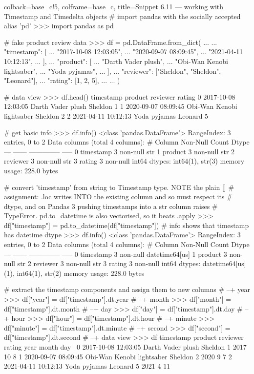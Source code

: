 \documentclass[a4paper,11pt]{book}
\begin{document}
\begin{pythoncode}[linenos=True]{colback=base_c!5, colframe=base_c, title=\sffamily Snippet 6.11 --- working with Timestamp and Timedelta objects}
# import pandas with the socially accepted alias 'pd'
>>> import pandas as pd

# fake product review data
>>> df = pd.DataFrame.from_dict(
...     {
...         "timestamp": [
...             "2017-10-08 12:03:05",
...             "2020-09-07 08:09:45",
...             "2021-04-11 10:12:13",
...         ],
...         "product": [
...             "Darth Vader plush",
...             "Obi-Wan Kenobi lightsaber",
...             "Yoda pyjamas",
...         ],
...         "reviewer": ["Sheldon", "Sheldon", "Leonard"],
...         "rating": [1, 2, 5],
...     }
... )

# data view
>>> df.head()
             timestamp                    product reviewer  rating
0  2017-10-08 12:03:05          Darth Vader plush  Sheldon       1
1  2020-09-07 08:09:45  Obi-Wan Kenobi lightsaber  Sheldon       2
2  2021-04-11 10:12:13               Yoda pyjamas  Leonard       5

# get basic info
>>> df.info()
<class 'pandas.DataFrame'>
RangeIndex: 3 entries, 0 to 2
Data columns (total 4 columns):
 #   Column     Non-Null Count  Dtype
---  ------     --------------  -----
 0   timestamp  3 non-null      str  
 1   product    3 non-null      str  
 2   reviewer   3 non-null      str  
 3   rating     3 non-null      int64
dtypes: int64(1), str(3)
memory usage: 228.0 bytes

# convert 'timestamp' from string to Timestamp type. NOTE the plain []
# assignment: .loc writes INTO the existing column and so must respect its
# dtype, and on Pandas 3 pushing timestamps into a str column raises
# TypeError. pd.to_datetime is also vectorised, so it beats .apply
>>> df["timestamp"] = pd.to_datetime(df["timestamp"])
# info shows that timestamp has datetime dtype
>>> df.info()
<class 'pandas.DataFrame'>
RangeIndex: 3 entries, 0 to 2
Data columns (total 4 columns):
 #   Column     Non-Null Count  Dtype         
---  ------     --------------  -----         
 0   timestamp  3 non-null      datetime64[us]
 1   product    3 non-null      str           
 2   reviewer   3 non-null      str           
 3   rating     3 non-null      int64         
dtypes: datetime64[us](1), int64(1), str(2)
memory usage: 228.0 bytes

# extract the timestamp components and assign them to new columns
# --+ year
>>> df["year"] = df["timestamp"].dt.year
# --+ month
>>> df["month"] = df["timestamp"].dt.month
# --+ day
>>> df["day"] = df["timestamp"].dt.day
# --+ hour
>>> df["hour"] = df["timestamp"].dt.hour
# --+ minute
>>> df["minute"] = df["timestamp"].dt.minute
# --+ second
>>> df["second"] = df["timestamp"].dt.second
# --+ data view
>>> df
            timestamp                    product reviewer  rating  year  month  day  \
0 2017-10-08 12:03:05          Darth Vader plush  Sheldon       1  2017     10    8   
1 2020-09-07 08:09:45  Obi-Wan Kenobi lightsaber  Sheldon       2  2020      9    7   
2 2021-04-11 10:12:13               Yoda pyjamas  Leonard       5  2021      4   11   


\end{pythoncode}
\end{document}
